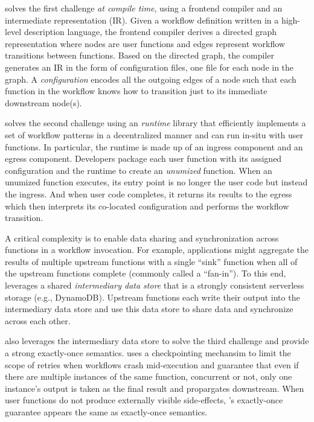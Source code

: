 \name{} solves the first challenge \emph{at compile time}, using a frontend
compiler and an intermediate representation (IR). Given a workflow definition
written in a high-level description language, the frontend compiler derives a
directed graph representation where nodes are user functions and edges
represent workflow transitions between functions. Based on the directed graph,
the compiler generates an IR in the form of configuration files, one file for
each node in the graph. A \textit{\name{} configuration} encodes all the outgoing edges
of a node such that each function in the workflow knows how to transition just
to its immediate downstream node(s).

\name{} solves the second challenge using an \textit{\name{} runtime} library
that efficiently implements a set of workflow patterns in a decentralized manner
and can run in-situ with user functions. In particular, the \name{} runtime is
made up of an ingress component and an egress component.  Developers package
each user function with its assigned \name{} configuration and the \name{}
runtime to create an \emph{unumized} function. When an unumized function
executes, its entry point is no longer the user code but instead the \name{}
ingress. And when user code completes, it returns its results to the \name{}
egress which then interprets its co-located \name{} configuration and performs
the workflow transition.

A critical complexity is to enable data sharing and synchronization across
functions in a workflow invocation. For example, applications might aggregate
the results of multiple upstream functions with a single ``sink'' function
when all of the upstream functions complete (commonly called a ``fan-in''). To
this end, \name{} leverages a shared \emph{intermediary data store} that is a
strongly consistent serverless storage (e.g., DynamoDB). Upstream functions
each write their output into the intermediary data store and use this data
store to share data and  synchronize across each other.


\name{} also leverages the intermediary data store to solve the third
challenge and provide a strong exactly-once semantics. \name{} uses a
checkpointing mechansim to limit the scope of retries when workflows crash
mid-execution and guarantee that even if there are multiple instances of the
same function, concurrent or not, only one instance's output is taken as the
final result and propargates downstream. When user functions do not produce
externally visible side-effects, \name{}'s exactly-once guarantee appears the
same as exactly-once semantics.

